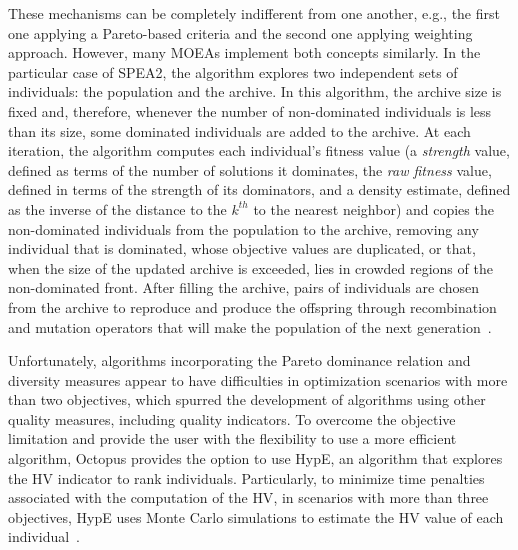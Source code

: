 These mechanisms can be completely indifferent from one another, e.g., the first one applying a Pareto-based criteria and the second one applying weighting approach. However, many \acp{MOEA} implement both concepts similarly. In the particular case of \ac{SPEA2}, the algorithm explores two independent sets of individuals: the population and the archive. In this algorithm, the archive size is fixed and, therefore, whenever the number of non-dominated individuals is less than its size, some dominated individuals are added to the archive. At each iteration, the algorithm computes each individual's fitness value (a \textit{strength} value, defined as terms of the number of solutions it dominates, the \textit{raw fitness} value, defined in terms of the strength of its dominators, and a density estimate, defined as the inverse of the distance to the $k^{th}$ to the nearest neighbor) and copies the non-dominated individuals from the population to the archive, removing any individual that is dominated, whose objective values are duplicated, or that, when the size of the updated archive is exceeded, lies in crowded regions of the non-dominated front. After filling the archive, pairs of individuals are chosen from the archive to reproduce and produce the offspring through recombination and mutation operators that will make the population of the next generation~\cite{Zitzler2001SPEA2}.
	
Unfortunately, algorithms incorporating the Pareto dominance relation and diversity measures appear to have difficulties in optimization scenarios with more than two objectives, which spurred the development of algorithms using other quality measures, including quality indicators. To overcome the objective limitation and provide the user with the flexibility to use a more efficient algorithm, Octopus provides the option to use \ac{HypE}, an algorithm that explores the \ac{HV} indicator to rank individuals. Particularly, to minimize time penalties associated with the computation of the \ac{HV}, in scenarios with more than three objectives, \ac{HypE} uses Monte Carlo simulations to estimate the \ac{HV} value of each individual~\cite{Zitzler2011HypE}. 

	
